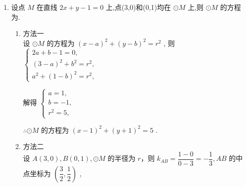 \begin{enumerate}
\begin{jieda}
\begin{enumerate}
\begin{enumerate}
                联立两直线方程得到圆心坐标为$(-3, 1)$，根据两点间距离公式可得半径为$r = 5$
            \end{enumerate}
            \item 因为$AB$的中垂线为直线$y = 6$，因此可设圆心坐标为$(a, 6)$，计算圆心到点$A$距离可知半径$r = \sqrt{(a-1)^2+16}$，根据点到直线距离公式可知半径为$r = \dfrac{|a-13|}{\sqrt{5}}$，因此$\sqrt{(a-1)^2+16} = \dfrac{|a-13|}{\sqrt{5}}$，解得$a = 3$或$-7$
        \end{enumerate}
    \end{jieda}
    
    \item 设点 $M$ 在直线 ${2x} + y - 1 = 0$ 上,点(3,0)和(0,1)均在 $\odot  M$ 上,则 $\odot  M$ 的方程为.
        \begin{jieda}
            \begin{enumerate}
                \item 方法一 \\
                设 $\odot  M$ 的方程为 ${\left( x - a\right) }^{2} + {\left( y - b\right) }^{2} = {r}^{2}$ , 则 $\left\{  \begin{array}{l} {2a} + b - 1 = 0, \\  {\left( 3 - a\right) }^{2} + {b}^{2} = {r}^{2}, \\  {a}^{2} + {\left( 1 - b\right) }^{2} = {r}^{2}, \end{array}\right.$
                
                解得 $\left\{  \begin{array}{l} a = 1, \\  b =  - 1, \\  {r}^{2} = 5, \end{array}\right.$
                
                $\therefore  \odot  M$ 的方程为 ${\left( x - 1\right) }^{2} + {\left( y + 1\right) }^{2} = 5$ .
                \item 方法二 \\
                设 $A\left( {3,0}\right) ,B\left( {0,1}\right) , \odot  M$ 的半径为 $r$，则 ${k}_{AB} = \dfrac{1 - 0}{0 - 3} =  - \dfrac{1}{3},{AB}$ 的中点坐标为 $\left( {\dfrac{3}{2},\dfrac{1}{2}}\right)$ ,
                

\end{enumerate}
\end{jieda}
\end{enumerate}
